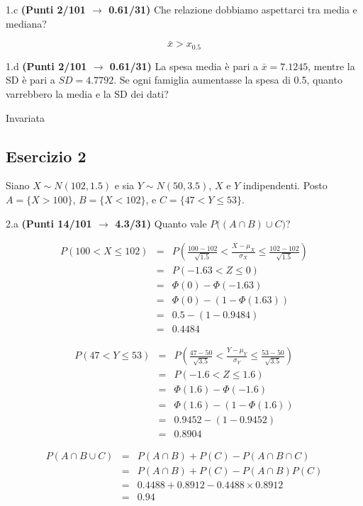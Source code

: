 \documentclass[
  11pt,
]{book}
\theoremstyle{mytheoremstyle}
\theoremstyle{mydefstyle}
\newenvironment{sol}
  {
  \begin{tcolorbox}[enhanced,breakable,arc=0.1mm,boxrule=1pt,colback=white,colframe=iblue,
  title=\bf \fontfamily{lmss}\selectfont \hspace{.5 cm} Soluzione,drop fuzzy shadow]

}{
\end{tcolorbox}
  }
\begin{document}
1.c \textbf{(Punti 2/101 \(\rightarrow\) 0.61/31)} Che relazione dobbiamo aspettarci tra media e mediana?

\begin{sol}
\[
\bar x > x_{0.5}
\]

\end{sol}

1.d \textbf{(Punti 2/101 \(\rightarrow\) 0.61/31)} La spesa media è pari a \(\bar x=7.1245\), mentre la SD è pari a \(SD=4.7792\).
Se ogni famiglia aumentasse la spesa di 0.5, quanto varrebbero la media e la SD dei dati?

\begin{sol}
Invariata

\end{sol}

\subsection{Esercizio 2}\label{esercizio-2-10}

Siano \(X\sim N(102,1.5)\) e sia \(Y\sim N(50,3.5)\), \(X\) e \(Y\) indipendenti. Posto \(A=\{X>100\}\), \(B=\{X<102\}\), e \(C=\{47<Y\le 53\}\).

2.a \textbf{(Punti 14/101 \(\rightarrow\) 4.3/31)} Quanto vale \(P\Big((A\cap B)\cup C\Big)\)?

\begin{sol}
\begin{eqnarray*}
   P( 100 < X \leq  102 ) &=& P\left( \frac { 100  -  102 }{\sqrt{ 1.5 }} < \frac { X  -  \mu_X }{ \sigma_X } \leq \frac { 102  -  102 }{\sqrt{ 1.5 }}\right)  \\
              &=& P\left(  -1.63  < Z \leq  0 \right) \\
              &=& \Phi( 0 )-\Phi( -1.63 )\\
              &=&  \Phi( 0 )-(1-\Phi( 1.63 )) \\ &=&  0.5 -(1- 0.9484 ) \\ 
              &=&  0.4484 
   \end{eqnarray*}

\begin{eqnarray*}
   P( 47 < Y \leq  53 ) &=& P\left( \frac { 47  -  50 }{\sqrt{ 3.5 }} < \frac { Y  -  \mu_Y }{ \sigma_Y } \leq \frac { 53  -  50 }{\sqrt{ 3.5 }}\right)  \\
              &=& P\left(  -1.6  < Z \leq  1.6 \right) \\
              &=& \Phi( 1.6 )-\Phi( -1.6 )\\
              &=&  \Phi( 1.6 )-(1-\Phi( 1.6 )) \\ &=&  0.9452 -(1- 0.9452 ) \\ 
              &=&  0.8904 
   \end{eqnarray*}

\begin{eqnarray*}
  P(A\cap B\cup C) &=&  P(A\cap B)+P(C)-P(A\cap B\cap C)\\
  &=& P(A\cap B)+P(C)-P(A\cap B)P(C)\\
  &=& 0.4488+0.8912-0.4488\times0.8912\\
  &=& 0.94
\end{eqnarray*}

\end{sol}
\end{document}
